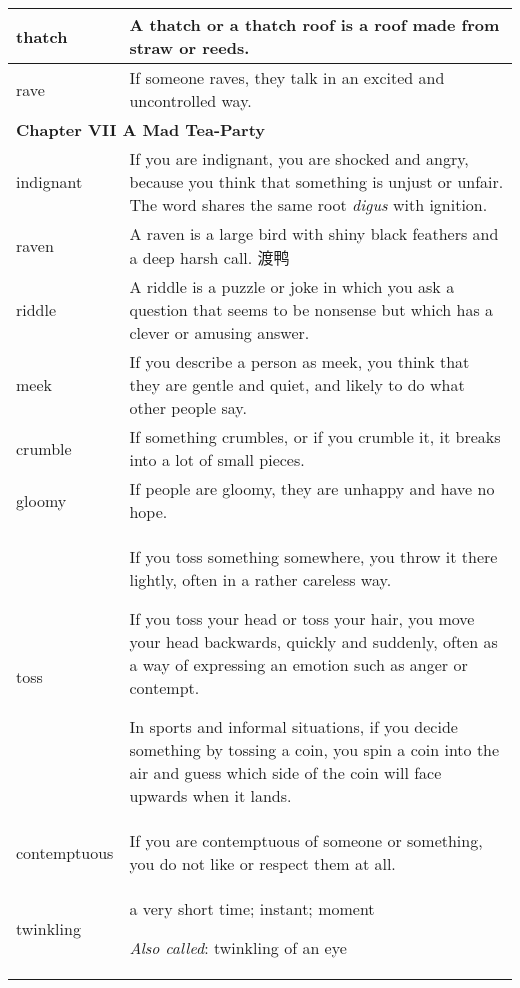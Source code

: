 \documentclass{article}
\begin{document}
\begin{center}
\begin{longtable}{|l|p{9cm}|}
\hline
thatch
&
A thatch or a thatch roof is a roof made from straw or reeds.
\\

\hline
rave
&
If someone raves, they talk in an excited and uncontrolled way.
\\

\hline
\multicolumn{2}{|l|}{\textbf{Chapter VII A Mad Tea-Party}}\\

\hline
indignant
&
If you are indignant, you are shocked and angry, because you think that something is unjust or unfair. The word shares the same root \textit{digus} with ignition.
\\

\hline
raven
&
A raven is a large bird with shiny black feathers and a deep harsh call. 渡鸭
\\

\hline
riddle
&
A riddle is a puzzle or joke in which you ask a question that seems to be nonsense but which has a clever or amusing answer.
\\

\hline
meek
&
If you describe a person as meek, you think that they are gentle and quiet, and likely to do what other people say.
\\

\hline
crumble
&
If something crumbles, or if you crumble it, it breaks into a lot of small pieces.
\\

\hline
gloomy
&
If people are gloomy, they are unhappy and have no hope.
\\

\hline
toss
&
If you toss something somewhere, you throw it there lightly, often in a rather careless way.
\par
If you toss your head or toss your hair, you move your head backwards, quickly and suddenly, often as a way of expressing an emotion such as anger or contempt.
\par
In sports and informal situations, if you decide something by tossing a coin, you spin a coin into the air and guess which side of the coin will face upwards when it lands.
\\

\hline
contemptuous
&
If you are contemptuous of someone or something, you do not like or respect them at all.
\\

\hline
twinkling
&
a very short time; instant; moment
\par
\textit{Also called}: twinkling of an eye
\\


\end{longtable}
\end{center}
\end{document}
